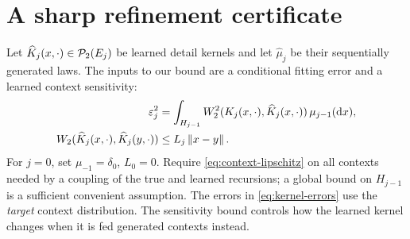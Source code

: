 \section{A sharp refinement certificate}\label{sec:certificate}
Let $\widehat K_j(x,\cdot)\in\mathcal P_2(E_j)$ be learned detail kernels and let $\widehat\mu_j$ be their sequentially generated laws. The inputs to our bound are a conditional fitting error and a learned context sensitivity:
\begin{align}\label{eq:kernel-errors}
 \varepsilon_j^2&=\int_{H_{j-1}}W_2^2(K_j(x,\cdot),\widehat K_j(x,\cdot))\,\mu_{j-1}(\mathrm dx),\\
 W_2(\widehat K_j(x,\cdot),\widehat K_j(y,\cdot))&\le L_j\left\lVert x-y\right\rVert.
 \label{eq:context-lipschitz}
\end{align}
For $j=0$, set $\mu_{-1}=\delta_0$, $L_0=0$. Require \eqref{eq:context-lipschitz} on all contexts needed by a coupling of the true and learned recursions; a global bound on $H_{j-1}$ is a sufficient convenient assumption. The errors in \eqref{eq:kernel-errors} use the \emph{target} context distribution. The sensitivity bound controls how the learned kernel changes when it is fed generated contexts instead.


